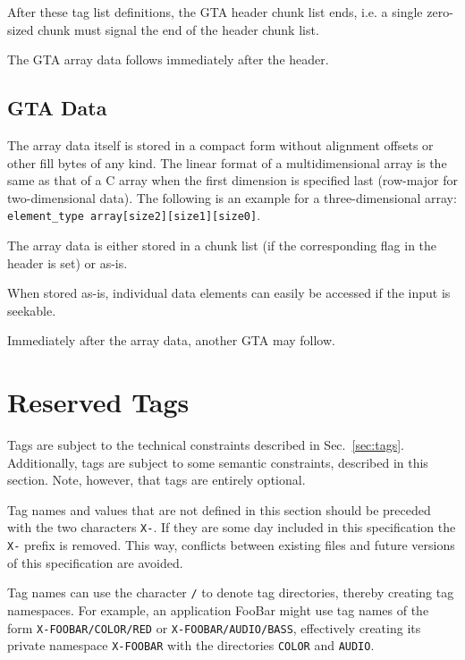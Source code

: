 \documentclass[a4paper,11pt]{article}
\newcommand{\code}[1]{\texttt{#1}}
\begin{document}
After these tag list definitions, the GTA header chunk list ends, i.e. a
single zero-sized chunk must signal the end of the header chunk list.

The GTA array data follows immediately after the header.

\subsection{GTA Data}

The array data itself is stored in a compact form without alignment offsets or
other fill bytes of any kind. The linear format of a multidimensional array is
the same as that of a C array when the first dimension is specified last
(row-major for two-dimensional data). The following is an example for a
three-dimensional array: \code{element\_type array[size2][size1][size0]}.

The array data is either stored in a chunk list (if the corresponding flag in
the header is set) or as-is.

When stored as-is, individual data elements can easily be accessed if the input
is seekable.

Immediately after the array data, another GTA may follow.

\section{Reserved Tags}
\label{sec:reserved-tags}

Tags are subject to the technical constraints described in Sec.~\ref{sec:tags}.
Additionally, tags are subject to some semantic constraints, described in this
section. Note, however, that tags are entirely optional.

Tag names and values that are not defined in this section should be preceded
with the two characters \code{X-}. If they are some day included in this
specification the \code{X-} prefix is removed. This way, conflicts between
existing files and future versions of this specification are avoided.

Tag names can use the character \code{/} to denote tag directories, thereby
creating tag namespaces. For example, an application FooBar might use tag
names of the form \code{X-FOOBAR/COLOR/RED} or \code{X-FOOBAR/AUDIO/BASS},
effectively creating its private namespace \code{X-FOOBAR} with the
directories \code{COLOR} and \code{AUDIO}.
\end{document}
